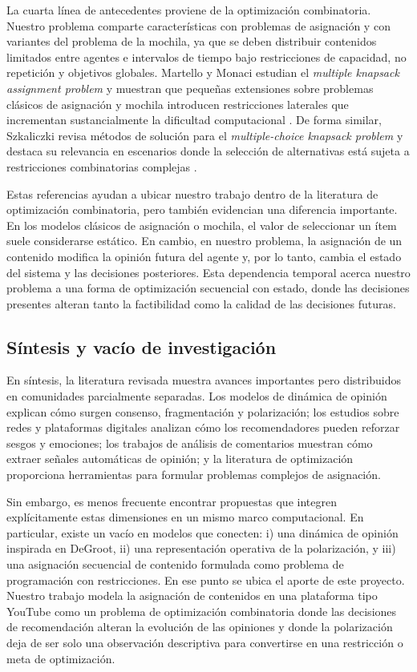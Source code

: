 \documentclass[10pt,letterpaper]{article}
\begin{document}
La cuarta l\'inea de antecedentes proviene de la optimizaci\'on combinatoria. Nuestro problema comparte caracter\'isticas con problemas de asignaci\'on y con variantes del problema de la mochila, ya que se deben distribuir contenidos limitados entre agentes e intervalos de tiempo bajo restricciones de capacidad, no repetici\'on y objetivos globales. Martello y Monaci estudian el \textit{multiple knapsack assignment problem} y muestran que peque\~nas extensiones sobre problemas cl\'asicos de asignaci\'on y mochila introducen restricciones laterales que incrementan sustancialmente la dificultad computacional \cite{martello-monaci-2018}. De forma similar, Szkaliczki revisa m\'etodos de soluci\'on para el \textit{multiple-choice knapsack problem} y destaca su relevancia en escenarios donde la selecci\'on de alternativas est\'a sujeta a restricciones combinatorias complejas \cite{szkaliczki2025}.

Estas referencias ayudan a ubicar nuestro trabajo dentro de la literatura de optimizaci\'on combinatoria, pero tambi\'en evidencian una diferencia importante. En los modelos cl\'asicos de asignaci\'on o mochila, el valor de seleccionar un \'item suele considerarse est\'atico. En cambio, en nuestro problema, la asignaci\'on de un contenido modifica la opini\'on futura del agente y, por lo tanto, cambia el estado del sistema y las decisiones posteriores. Esta dependencia temporal acerca nuestro problema a una forma de optimizaci\'on secuencial con estado, donde las decisiones presentes alteran tanto la factibilidad como la calidad de las decisiones futuras.

\subsection{S\'intesis y vac\'io de investigaci\'on}

En s\'intesis, la literatura revisada muestra avances importantes pero distribuidos en comunidades parcialmente separadas. Los modelos de din\'amica de opini\'on explican c\'omo surgen consenso, fragmentaci\'on y polarizaci\'on; los estudios sobre redes y plataformas digitales analizan c\'omo los recomendadores pueden reforzar sesgos y emociones; los trabajos de an\'alisis de comentarios muestran c\'omo extraer se\~nales autom\'aticas de opini\'on; y la literatura de optimizaci\'on proporciona herramientas para formular problemas complejos de asignaci\'on.

Sin embargo, es menos frecuente encontrar propuestas que integren expl\'icitamente estas dimensiones en un mismo marco computacional. En particular, existe un vac\'io en modelos que conecten: i) una din\'amica de opini\'on inspirada en DeGroot, ii) una representaci\'on operativa de la polarizaci\'on, y iii) una asignaci\'on secuencial de contenido formulada como problema de programaci\'on con restricciones. En ese punto se ubica el aporte de este proyecto. Nuestro trabajo modela la asignaci\'on de contenidos en una plataforma tipo YouTube como un problema de optimizaci\'on combinatoria donde las decisiones de recomendaci\'on alteran la evoluci\'on de las opiniones y donde la polarizaci\'on deja de ser solo una observaci\'on descriptiva para convertirse en una restricci\'on o meta de optimizaci\'on.
\end{document}
